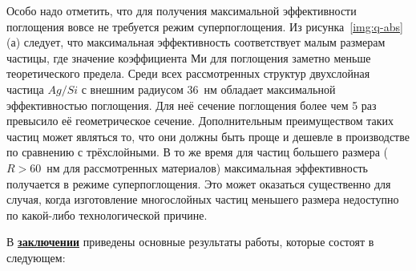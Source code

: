 Особо надо отметить, что для получения максимальной эффективности
поглощения вовсе не требуется режим суперпоглощения.  Из
рисунка~\ref{img:q-abs}(а) следует, что максимальная эффективность
соответствует малым размерам частицы, где значение коэффициента Ми для
поглощения заметно меньше теоретического предела.  Среди всех
рассмотренных структур двухслойная частица $Ag/Si$ с внешним радиусом
36~нм обладает максимальной эффективностью поглощения.  Для неё
сечение поглощения более чем 5 раз превысило её геометрическое
сечение. Дополнительным преимуществом таких частиц может являться то,
что они должны быть проще и дешевле в производстве по сравнению с
трёхслойными.  В то же время для частиц большего размера ($R>60$~нм
для рассмотренных материалов) максимальная эффективность получается в
режиме суперпоглощения.  Это может оказаться существенно для случая,
когда изготовление многослойных частиц меньшего размера недоступно по
какой-либо технологической причине.


В \underline{\textbf{заключении}} приведены основные результаты
работы, которые состоят в следующем: 




